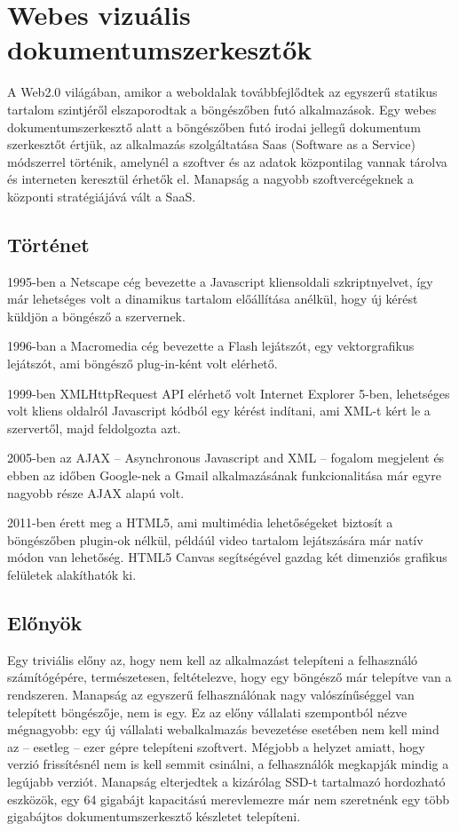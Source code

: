 \chapter{Webes vizuális dokumentumszerkesztők}

A Web2.0 világában, amikor a weboldalak továbbfejlődtek az egyszerű statikus tartalom szintjéről elszaporodtak a böngészőben futó alkalmazások. Egy webes dokumentumszerkesztő alatt a böngészőben futó irodai jellegű dokumentum szerkesztőt értjük, az alkalmazás szolgáltatása Saas (Software as a Service) módszerrel történik, amelynél a szoftver és az adatok központilag vannak tárolva és interneten keresztül érhetők el. Manapság a nagyobb szoftvercégeknek a központi stratégiájává vált a SaaS\cite{Saasref}.

\section{Történet}

1995-ben a Netscape cég bevezette a Javascript kliensoldali szkriptnyelvet, így már lehetséges volt a dinamikus tartalom előállítása anélkül, hogy új kérést küldjön a böngésző a szervernek.

1996-ban a Macromedia cég bevezette a Flash lejátszót, egy vektorgrafikus lejátszót, ami böngésző plug-in-ként volt elérhető.

1999-ben XMLHttpRequest API elérhető volt Internet Explorer 5-ben, lehetséges volt kliens oldalról Javascript kódból egy kérést indítani, ami XML-t kért le a szervertől, majd feldolgozta azt.

2005-ben az AJAX -- Asynchronous Javascript and XML -- fogalom megjelent \cite{ajax} és ebben az időben Google-nek a Gmail alkalmazásának  funkcionalitása már egyre nagyobb része AJAX alapú volt.

2011-ben érett meg a HTML5, ami multimédia lehetőségeket biztosít a böngészőben plugin-ok nélkül, példáúl video tartalom lejátszására már natív módon van lehetőség. HTML5 Canvas segítségével gazdag két dimenziós grafikus felületek alakíthatók ki. 

\section{Előnyök}

Egy triviális előny az, hogy nem kell az alkalmazást telepíteni a felhasználó számítógépére, természetesen, feltételezve, hogy egy böngésző már telepítve van a rendszeren. Manapság az egyszerű felhasználónak nagy valószínűséggel van telepített böngészője, nem is egy. Ez az előny vállalati szempontból nézve mégnagyobb: egy új vállalati webalkalmazás bevezetése esetében nem kell mind az -- esetleg -- ezer gépre telepíteni szoftvert.
Mégjobb a helyzet amiatt, hogy verzió frissítésnél nem is kell semmit csinálni, a felhasználók megkapják mindig a legújabb verziót. Manapság elterjedtek a kizárólag SSD-t tartalmazó hordozható eszközök, egy 64 gigabájt kapacitású merevlemezre már nem szeretnénk egy több gigabájtos dokumentumszerkesztő készletet telepíteni.

